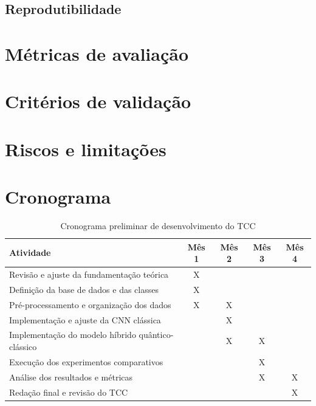 \documentclass[
    12pt,
    openright,
    oneside,
    a4paper,
    english,
    brazil
]{abntex2}
\begin{document}
\subsection{Reprodutibilidade}

\section{Métricas de avaliação}


\section{Critérios de validação}


\section{Riscos e limitações}


\section{Cronograma}


\begin{table}[htb]
\centering
\caption{Cronograma preliminar de desenvolvimento do TCC}
\label{tab:cronograma}
\begin{tabular}{|p{7cm}|c|c|c|c|}
\hline
\textbf{Atividade} & \textbf{Mês 1} & \textbf{Mês 2} & \textbf{Mês 3} & \textbf{Mês 4} \\ \hline
Revisão e ajuste da fundamentação teórica & X &  &  &  \\ \hline
Definição da base de dados e das classes & X &  &  &  \\ \hline
Pré-processamento e organização dos dados & X & X &  &  \\ \hline
Implementação e ajuste da CNN clássica &  & X &  &  \\ \hline
Implementação do modelo híbrido quântico-clássico &  & X & X &  \\ \hline
Execução dos experimentos comparativos &  &  & X &  \\ \hline
Análise dos resultados e métricas &  &  & X & X \\ \hline
Redação final e revisão do TCC &  &  &  & X \\ \hline
\end{tabular}
\end{table}


\postextual


\end{document}
